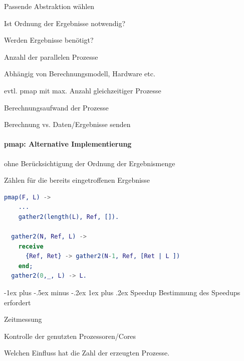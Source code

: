\documentclass[10pt]{article}
\makeatletter
\renewcommand{\subsubsection}{\@startsection{subsubsection}{3}{0mm}%
                                {-1ex plus -.5ex minus -.2ex}%
                                {1ex plus .2ex}%
                                {\normalfont\small\bfseries}}
\makeatother
\begin{document}
  \begin{itemize*}
    \item Passende Abstraktion wählen
    \begin{itemize*}
      \item Ist Ordnung der Ergebnisse notwendig?
      \item Werden Ergebnisse benötigt?
    \end{itemize*}
    \item Anzahl der parallelen Prozesse
    \begin{itemize*}
      \item Abhängig von Berechnungsmodell, Hardware etc.
      \item evtl. pmap mit max. Anzahl gleichzeitiger Prozesse
    \end{itemize*}
    \item Berechnungsaufwand der Prozesse
    \begin{itemize*}
      \item Berechnung vs. Daten/Ergebnisse senden
    \end{itemize*}
  \end{itemize*}
  
  \paragraph{pmap: Alternative Implementierung}
  
  \begin{itemize*}
    \item ohne Berücksichtigung der Ordnung der Ergebnismenge
    \item Zählen für die bereits eingetroffenen Ergebnisse
  \end{itemize*}
  \begin{lstlisting}[language=erlang]
  pmap(F, L) ->
    ...
    gather2(length(L), Ref, []).
  
  gather2(N, Ref, L) ->
    receive
      {Ref, Ret} -> gather2(N-1, Ref, [Ret | L ])
    end;
  gather2(0,_, L) -> L.
\end{lstlisting}
  
  \subsubsection{Speedup}
  Bestimmung des Speedups erfordert
  \begin{itemize*}
    \item Zeitmessung
    \item Kontrolle der genutzten Prozessoren/Cores
  \end{itemize*}
  \color{orange} Welchen Einfluss hat die Zahl der erzeugten Prozesse. \color{black}
  
\end{document}
